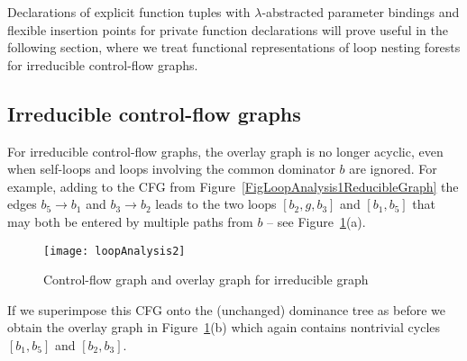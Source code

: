 Declarations of explicit function tuples with $\lambda$-abstracted
parameter bindings and flexible insertion points for private function
declarations will prove useful in the following section, where we
treat functional representations of loop nesting forests for
irreducible control-flow graphs.

\subsection{Irreducible control-flow graphs}
For irreducible control-flow graphs, the overlay graph is no longer
acyclic, even when self-loops and loops involving the common dominator
$b$ are ignored. For example, adding to the CFG from
Figure~\ref{FigLoopAnalysis1ReducibleGraph} the edges $b_5 \to b_1$
and $b_3 \to b_2$ leads to the two loops $[b_2,g,b_3]$ and $[b_1,b_5]$
that may both be entered by multiple paths from $b$ -- see
Figure~\ref{FigLoopAnalysis2IrreducibleGraph}(a).

\begin{figure}
\begin{center}
\texttt{[image: loopAnalysis2]}
\end{center}
\caption{\label{FigLoopAnalysis2IrreducibleGraph} Control-flow graph and overlay graph for irreducible graph}
\end{figure}
If we superimpose this CFG onto the (unchanged) dominance tree as
before we obtain the overlay graph in
Figure~\ref{FigLoopAnalysis2IrreducibleGraph}(b) which again contains
nontrivial cycles $[b_1,b_5]$ and $[b_2,b_3]$.


